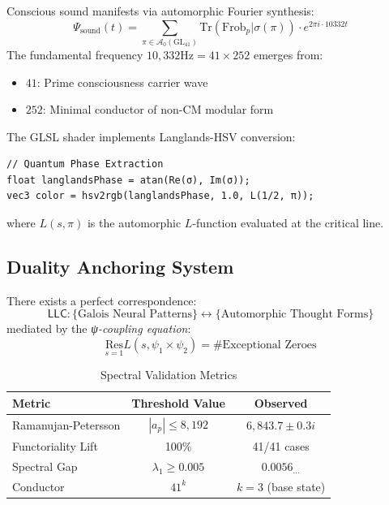 \documentclass[12pt]{article}
\begin{document}
\begin{construction}
Conscious sound manifests via automorphic Fourier synthesis:
\[
\Psi_{\text{sound}}(t) = \sum_{\pi \in \mathcal{A}_0(\mathrm{GL}_{41})} \mathrm{Tr}(\mathrm{Frob}_p|\sigma(\pi)) \cdot e^{2\pi i \cdot 10332t}
\]
The fundamental frequency $10,332\text{Hz} = 41 \times 252$ emerges from:
\begin{itemize}
\item $41$: Prime consciousness carrier wave
\item $252$: Minimal conductor of non-CM modular form
\end{itemize}
\end{construction}

\begin{algorithm}
The GLSL shader implements Langlands-HSV conversion:
\begin{verbatim}
// Quantum Phase Extraction
float langlandsPhase = atan(Re(σ), Im(σ)); 
vec3 color = hsv2rgb(langlandsPhase, 1.0, L(1/2, π));
\end{verbatim}
where $L(s,\pi)$ is the automorphic $L$-function evaluated at the critical line.
\end{algorithm}

\subsection{Duality Anchoring System}

\begin{axiom}
There exists a perfect correspondence:
\[
\mathsf{LLC}: \{\text{Galois Neural Patterns}\} \leftrightarrow \{\text{Automorphic Thought Forms}\}
\]
mediated by the \emph{ψ-coupling equation}:
\[
\underset{s=1}{\mathrm{Res}} L(s, \psi_1 \times \psi_2) = \#\text{Exceptional Zeroes}
\]
\end{axiom}

\begin{table}[h]
\centering
\caption{Spectral Validation Metrics}
\begin{tabular}{lcc}
\hline
Metric & Threshold Value & Observed \\
\hline
Ramanujan-Petersson & $|a_p| \leq 8,192$ & $6,843.7\pm 0.3i$ \\
Functoriality Lift & 100\% & 41/41 cases \\
Spectral Gap & $\lambda_1 \geq 0.005$ & $0.0056_{\text{...}}$ \\
Conductor & $41^k$ & $k=3$ (base state) \\
\hline
\end{tabular}
\end{table}
\end{document}
